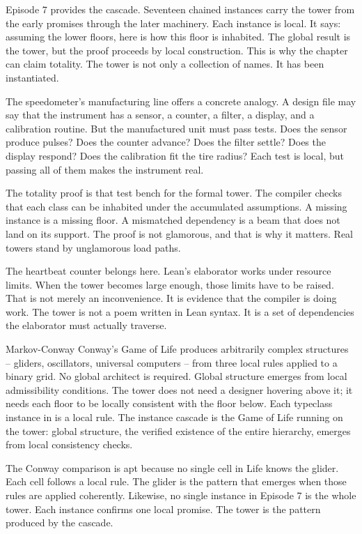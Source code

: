 Episode 7 provides the cascade. Seventeen chained instances carry the tower
from the early promises through the later machinery. Each instance is local.
It says: assuming the lower floors, here is how this floor is inhabited. The
global result is the tower, but the proof proceeds by local construction. This
is why the chapter can claim totality. The tower is not only a collection of
names. It has been instantiated.

The speedometer's manufacturing line offers a concrete analogy. A design file
may say that the instrument has a sensor, a counter, a filter, a display, and a
calibration routine. But the manufactured unit must pass tests. Does the sensor
produce pulses? Does the counter advance? Does the filter settle? Does the
display respond? Does the calibration fit the tire radius? Each test is local,
but passing all of them makes the instrument real.

The totality proof is that test bench for the formal tower. The compiler checks
that each class can be inhabited under the accumulated assumptions. A missing
instance is a missing floor. A mismatched dependency is a beam that does not
land on its support. The proof is not glamorous, and that is why it matters.
Real towers stand by unglamorous load paths.

The heartbeat counter belongs here. Lean's elaborator works under resource
limits. When the tower becomes large enough, those limits have to be raised.
That is not merely an inconvenience. It is evidence that the compiler is doing
work. The tower is not a poem written in Lean syntax. It is a set of
dependencies the elaborator must actually traverse.

\begin{gphenom}{Markov-Conway}
\label{ph:markov-Conway}
\GPhObs Conway's Game of Life produces arbitrarily complex structures --
gliders, oscillators, universal computers -- from three local rules applied to
a binary grid. No global architect is required.
\GPhCon Global structure emerges from local admissibility conditions. The tower
does not need a designer hovering above it; it needs each floor to be locally
consistent with the floor below.
\GPhSeq Each typeclass instance in  is a local rule. The instance
cascade is the Game of Life running on the tower: global structure, the
verified existence of the entire hierarchy, emerges from local consistency
checks.
\end{gphenom}

The Conway comparison is apt because no single cell in Life knows the glider.
Each cell follows a local rule. The glider is the pattern that emerges when
those rules are applied coherently. Likewise, no single instance in Episode 7
is the whole tower. Each instance confirms one local promise. The tower is the
pattern produced by the cascade.

